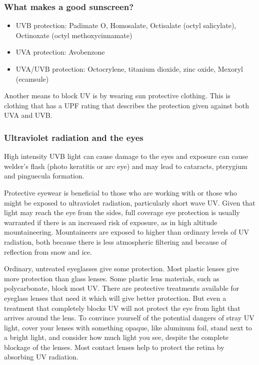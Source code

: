             \subsubsection{  What makes a good sunscreen? }
            \nopagebreak
        \label{m38779*id189518}\begin{itemize}[noitemsep]
            \label{m38779*uid18}\item UVB protection: Padimate O, Homosalate, Octisalate (octyl salicylate), Octinoxate (octyl methoxycinnamate)
\label{m38779*uid19}\item UVA protection: Avobenzone
\label{m38779*uid20}\item UVA/UVB protection: Octocrylene, titanium dioxide, zinc oxide, Mexoryl (ecamsule)
\end{itemize}
        \label{m38779*id189561}Another means to block UV is by wearing sun protective clothing. This is clothing that has a UPF rating that describes the protection given against both UVA and UVB. \par 
      \label{m38779*uid21}
            \subsubsection{ Ultraviolet radiation and the eyes}
            \nopagebreak
        \label{m38779*id189581}High intensity UVB light can cause damage to the eyes and exposure can cause welder's flash (photo keratitis or arc eye) and may lead to cataracts, pterygium and pinguecula formation.\par 
        \label{m38779*id189586}Protective eyewear is beneficial to those who are working with or those who might be exposed to ultraviolet radiation, particularly short wave UV. Given that light may reach the eye from the sides, full coverage eye protection is usually warranted if there is an increased risk of exposure, as in high altitude mountaineering. Mountaineers are exposed to higher than ordinary levels of UV radiation, both because there is less atmospheric filtering and because of reflection from snow and ice.\par 
        \label{m38779*id189594}Ordinary, untreated eyeglasses give some protection. Most plastic lenses give more protection than glass lenses. Some plastic lens materials, such as polycarbonate, block most UV. There are protective treatments available for eyeglass lenses that need it which will give better protection. But even a treatment that completely blocks UV will not protect the eye from light that arrives around the lens. To convince yourself of the potential dangers of stray UV light, cover your lenses with something opaque, like aluminum foil, stand next to a bright light, and consider how much light you see, despite the complete blockage of the lenses. Most contact lenses help to protect the retina by absorbing UV radiation.\par 
      \label{m38779*uid22}
